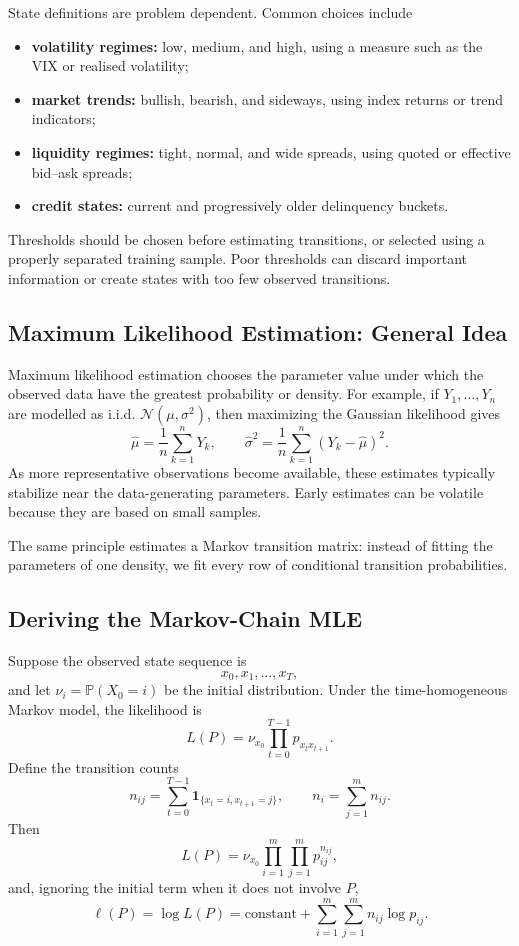 \documentclass[12pt,openany]{book}
\theoremstyle{definition}
\theoremstyle{remark}
\begin{document}
State definitions are problem dependent. Common choices include
\begin{itemize}
    \item \textbf{volatility regimes:} low, medium, and high, using a measure
    such as the VIX or realised volatility;
    \item \textbf{market trends:} bullish, bearish, and sideways, using index
    returns or trend indicators;
    \item \textbf{liquidity regimes:} tight, normal, and wide spreads, using
    quoted or effective bid--ask spreads;
    \item \textbf{credit states:} current and progressively older
    delinquency buckets.
\end{itemize}

Thresholds should be chosen before estimating transitions, or selected using
a properly separated training sample. Poor thresholds can discard important
information or create states with too few observed transitions.

\subsection{Maximum Likelihood Estimation: General Idea}

Maximum likelihood estimation chooses the parameter value under which the
observed data have the greatest probability or density. For example, if
\(Y_1,\ldots,Y_n\) are modelled as i.i.d.
\(\mathcal{N}(\mu,\sigma^2)\), then maximizing the Gaussian likelihood gives
\[
\widehat\mu
=\frac1n\sum_{k=1}^{n}Y_k,
\qquad
\widehat\sigma^2
=\frac1n\sum_{k=1}^{n}(Y_k-\widehat\mu)^2.
\]
As more representative observations become available, these estimates
typically stabilize near the data-generating parameters. Early estimates can
be volatile because they are based on small samples.

The same principle estimates a Markov transition matrix: instead of fitting
the parameters of one density, we fit every row of conditional transition
probabilities.

\subsection{Deriving the Markov-Chain MLE}

Suppose the observed state sequence is
\[
x_0,x_1,\ldots,x_T,
\]
and let \(\nu_i=\mathbb{P}(X_0=i)\) be the initial distribution. Under the
time-homogeneous Markov model, the likelihood is
\[
L(P)
=\nu_{x_0}
\prod_{t=0}^{T-1}p_{x_t x_{t+1}}.
\]
Define the transition counts
\[
n_{ij}
=\sum_{t=0}^{T-1}
\mathbf{1}_{\{x_t=i,x_{t+1}=j\}},
\qquad
n_i=\sum_{j=1}^{m}n_{ij}.
\]
Then
\[
L(P)
=\nu_{x_0}
\prod_{i=1}^{m}\prod_{j=1}^{m}p_{ij}^{n_{ij}},
\]
and, ignoring the initial term when it does not involve \(P\),
\[
\ell(P)
=\log L(P)
=\text{constant}
+\sum_{i=1}^{m}\sum_{j=1}^{m}n_{ij}\log p_{ij}.
\]
\end{document}
